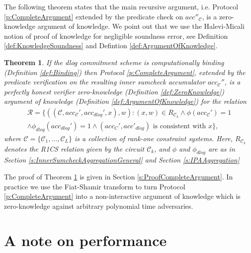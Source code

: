 \documentclass[10pt,article,oneside]{memoir}
\newtheorem{thm}{Theorem}[]
\theoremstyle{definition}
\theoremstyle{remark}
\begin{document}
\medskip
The following theorem states that the main recursive argument, i.e. Protocol \ref{p:CompleteArgument} extended by the predicate check on $acc''_{\mathcal C}$, is a zero-knowledge argument of knowledge.
We point out that we use the Halevi-Micali \cite{PoKHaleviMikali} notion of proof of knowledge for negligible soundness error, see Definition \ref{def:KnowledgeSoundness} and Defintion \ref{def:ArgumentOfKnowledge}.

\begin{thm}
\label{thm:CompleteProtocol}
If the dlog commitment scheme is computationally binding (Definition \ref{def:Binding}) then Protocol \ref{p:CompleteArgument}, extended by the predicate verification on the resulting inner sumcheck accumulator $acc_\mathcal C''$, is a perfectly honest verifier zero-knowledge (Definition \ref{def:ZeroKnowledge}) argument of knowledge (Definition \ref{def:ArgumentOfKnowledge}) for the relation 
\begin{multline*}
\mathcal R = \big\{((\mathcal C, acc_\mathcal C',acc_{dlog}', x),w) :  (x,w)\in R_{\mathcal C_k}
\wedge \phi(acc_{\mathcal C}')=1
\\
\wedge  \phi_{dlog}(acc_{dlog}')=1 
\wedge (acc_C',acc'_{dlog}) \text{ is consistent with }x
\big\},
\end{multline*}
where $\mathcal C=\{\mathcal C_1,\ldots, \mathcal C_L\}$ is a collection of rank-one constraint systems.
Here, $R_{\mathcal C_k}$ denotes the R1CS relation given by the circuit $\mathcal C_k$, and  $\phi$ and $\phi_{dlog}$ are as in Section \ref{s:InnerSumcheckAggregationGeneral} and Section \ref{s:IPAAggregation}
\end{thm}
The proof of Theorem \ref{thm:CompleteProtocol} is given in Section \ref{s:ProofCompleteArgument}.
In practice we use the Fiat-Shamir transform to turn Protocol \ref{p:CompleteArgument} into a non-interactive argument of knowledge which is zero-knowledge against arbitrary polynomial time adversaries.

\section{A note on performance}
\label{s:Performance}
\end{document}
